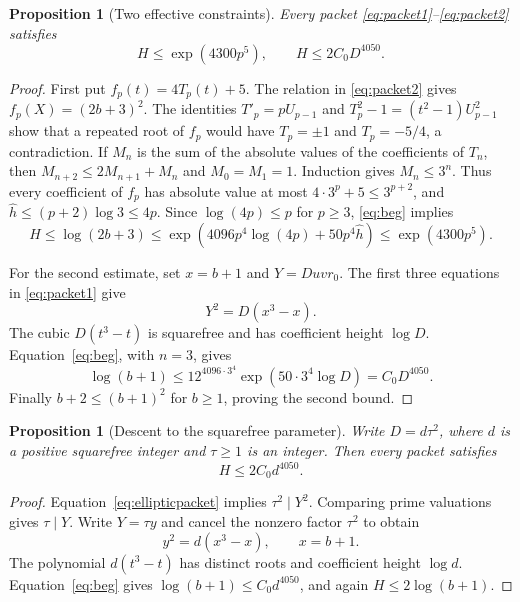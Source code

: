 \documentclass[11pt]{amsart}
\newtheorem{proposition}[theorem]{Proposition}
\theoremstyle{definition}
\theoremstyle{remark}
\begin{document}
\begin{proposition}[Two effective constraints]\label{prop:pell}
Every packet \eqref{eq:packet1}--\eqref{eq:packet2} satisfies
\begin{equation}\label{eq:two-effective}
 H\le\exp(4300p^5),\qquad H\le2C_0D^{4050}.
\end{equation}
\end{proposition}
\begin{proof}
First put $f_p(t)=4T_p(t)+5$. The relation in \eqref{eq:packet2} gives
$f_p(X)=(2b+3)^2$.
The identities $T'_p=pU_{p-1}$ and
$T_p^2-1=(t^2-1)U_{p-1}^2$ show that a repeated root of $f_p$ would have
$T_p=\pm1$ and $T_p=-5/4$, a contradiction.
If $M_n$ is the sum of the absolute values of the coefficients of $T_n$,
then $M_{n+2}\le2M_{n+1}+M_n$ and $M_0=M_1=1$.
Induction gives $M_n\le3^n$. Thus every coefficient of $f_p$ has
absolute value at most $4\cdot3^p+5\le3^{p+2}$, and
$\widehat h\le(p+2)\log3\le4p$.
Since $\log(4p)\le p$ for $p\ge3$, \eqref{eq:beg} implies
\[
 H\le\log(2b+3)
 \le\exp\!\left(4096p^4\log(4p)+50p^4\widehat h\right)
 \le\exp(4300p^5).
\]

For the second estimate, set $x=b+1$ and $Y=Duvr_0$.
The first three equations in \eqref{eq:packet1} give
\begin{equation}\label{eq:ellipticpacket}
 Y^2=D(x^3-x).
\end{equation}
The cubic $D(t^3-t)$ is squarefree and has coefficient height $\log D$.
Equation~\eqref{eq:beg}, with $n=3$, gives
\[
 \log(b+1)\le12^{4096\cdot3^4}\exp(50\cdot3^4\log D)
 =C_0D^{4050}.
\]
Finally $b+2\le(b+1)^2$ for $b\ge1$, proving the second bound.
\end{proof}

\begin{proposition}[Descent to the squarefree parameter]\label{prop:descent}
Write $D=d\tau^2$, where $d$ is a positive squarefree integer and
$\tau\ge1$ is an integer. Then every packet satisfies
\[
 H\le2C_0d^{4050}.
\]
\end{proposition}
\begin{proof}
Equation~\eqref{eq:ellipticpacket} implies $\tau^2\mid Y^2$.
Comparing prime valuations gives $\tau\mid Y$. Write $Y=\tau y$ and
cancel the nonzero factor $\tau^2$ to obtain
\[
 y^2=d(x^3-x),\qquad x=b+1.
\]
The polynomial $d(t^3-t)$ has distinct roots and coefficient height
$\log d$. Equation~\eqref{eq:beg} gives
$\log(b+1)\le C_0d^{4050}$, and again $H\le2\log(b+1)$.
\end{proof}
\end{document}
